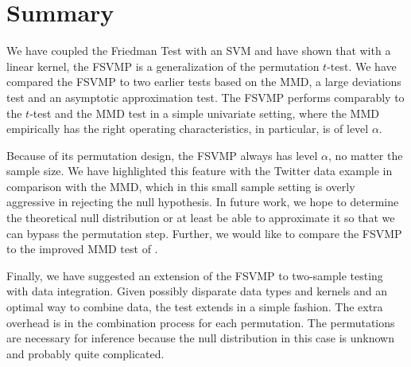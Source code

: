 \documentclass{article} %
\theoremstyle{remark}
\begin{document}
\section{Summary}
We have coupled the Friedman Test with an SVM and have shown that with
a linear kernel, the FSVMP is a generalization of the permutation
$t$-test.  We have compared the FSVMP to two earlier tests based on the
MMD, a large deviations test and an asymptotic approximation test.
The FSVMP performs comparably to the $t$-test and the MMD test in a
simple univariate setting, where the MMD empirically has the right
operating characteristics, in particular, is of level $\alpha$.  

Because of its permutation design, the FSVMP always has level
$\alpha$, no matter the sample size.  We have highlighted this feature
with the Twitter data example in comparison with the MMD, which in
this small sample setting is overly aggressive in rejecting the null
hypothesis.  In future work, we hope to determine the theoretical null
distribution or at least be able to approximate it so that we can
bypass the permutation step.  Further, we would like to compare the
FSVMP to the improved MMD test of \cite{gretton2010fast}.

Finally, we have suggested an extension of the FSVMP to two-sample
testing with data integration.  Given possibly disparate data types and
kernels and an optimal way to combine data, the test extends in a
simple fashion.  The extra overhead is in the combination process for
each permutation.  The permutations are necessary for inference because the null
distribution in this case is unknown and probably quite complicated.  



\end{document}
